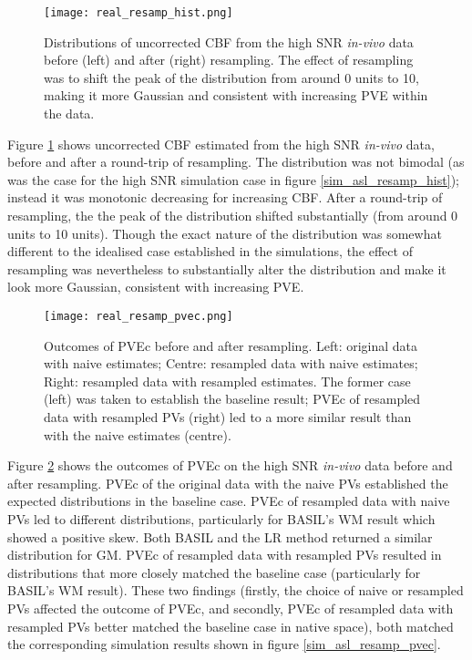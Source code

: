\begin{figure}[H]
\centering
\texttt{[image: real\_resamp\_hist.png]}
\caption{Distributions of uncorrected CBF from the high SNR \textit{in-vivo} data before (left) and after (right) resampling. The effect of resampling was to shift the peak of the distribution from around 0 units to 10, making it more Gaussian and consistent with increasing PVE within the data.}
\label{real_resamp_hist}
\end{figure}

Figure \ref{real_resamp_hist} shows uncorrected CBF estimated from the high SNR \textit{in-vivo} data, before and after a round-trip of resampling. The distribution was not bimodal (as was the case for the high SNR simulation case in figure \ref{sim_asl_resamp_hist}); instead it was monotonic decreasing for increasing CBF. After a round-trip of resampling, the the peak of the distribution shifted substantially (from around 0 units to 10 units). Though the exact nature of the distribution was somewhat different to the idealised case established in the simulations, the effect of resampling was nevertheless to substantially alter the distribution and make it look more Gaussian, consistent with increasing PVE.  
 
\begin{figure}[H]
\centering
\texttt{[image: real\_resamp\_pvec.png]}
\caption{Outcomes of PVEc before and after resampling. Left: original data with naive estimates; Centre: resampled data with naive estimates; Right: resampled data with resampled estimates. The former case (left) was taken to establish the baseline result; PVEc of resampled data with resampled PVs (right) led to a more similar result than with the naive estimates (centre).}
\label{real_resamp_pvec}
\end{figure}

Figure \ref{real_resamp_pvec} shows the outcomes of PVEc on the high SNR \textit{in-vivo} data before and after resampling. PVEc of the original data with the naive PVs established the expected distributions in the baseline case. PVEc of resampled data with naive PVs led to different distributions, particularly for BASIL's WM result which showed a positive skew. Both BASIL and the LR method returned a similar distribution for GM. PVEc of resampled data with resampled PVs resulted in distributions that more closely matched the baseline case (particularly for BASIL's WM result). These two findings (firstly, the choice of naive or resampled PVs affected the outcome of PVEc, and secondly, PVEc of resampled data with resampled PVs better matched the baseline case in native space), both matched the corresponding simulation results shown in figure \ref{sim_asl_resamp_pvec}. 


